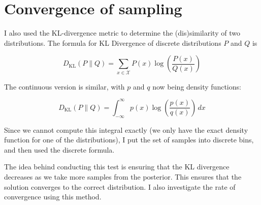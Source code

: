 \begin{table}[!ht]
	\centering
	\caption{p-values of K-S test on different models using different inference procedures}
	\label{tab:ks-pvals}
\end{table}


\section{Convergence of sampling}

I also used the KL-divergence metric to determine the (dis)similarity of two distributions. The formula for KL Divergence of discrete distributions $P$ and $Q$ is

$${D_{\text{KL}}(P\parallel Q)=\sum _{x\in {\mathcal {X}}}P(x)\log \left({\frac {P(x)}{Q(x)}}\right)}$$

The continuous version is similar, with $p$ and $q$ now being density functions:

$${D_\text{KL}}(P\parallel Q)=\int _{-\infty }^{\infty }p(x)\log \left({\frac {p(x)}{q(x)}}\right)\,dx$$

Since we cannot compute this integral exactly (we only have the exact density function for one of the distributions), I put the set of samples into discrete bins, and then used the discrete formula.

The idea behind conducting this test is ensuring that the KL divergence decreases as we take more samples from the posterior. This ensures that the solution converges to the correct distribution. I also investigate the rate of convergence using this method.

